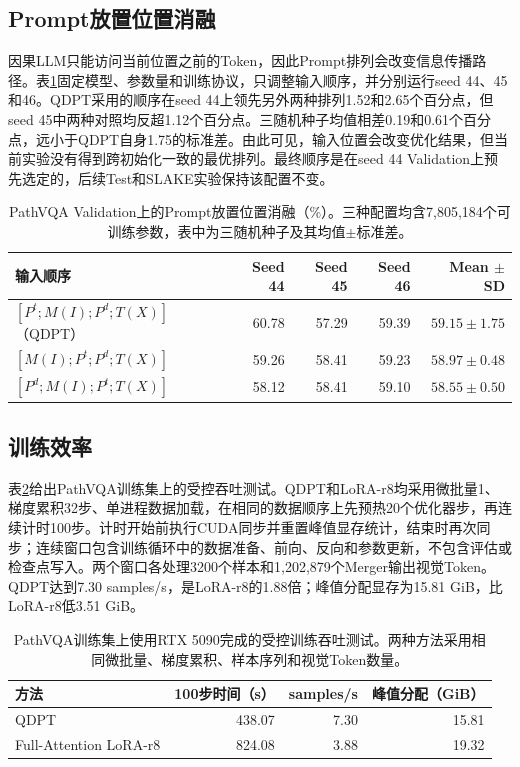 \documentclass[pdflatex,sn-mathphys-num]{sn-jnl}
\begin{document}
\subsection{Prompt放置位置消融}

因果LLM只能访问当前位置之前的Token，因此Prompt排列会改变信息传播路径。表\ref{tab:prompt-placement}固定模型、参数量和训练协议，只调整输入顺序，并分别运行seed 44、45和46。QDPT采用的顺序在seed 44上领先另外两种排列1.52和2.65个百分点，但seed 45中两种对照均反超1.12个百分点。三随机种子均值相差0.19和0.61个百分点，远小于QDPT自身1.75的标准差。由此可见，输入位置会改变优化结果，但当前实验没有得到跨初始化一致的最优排列。最终顺序是在seed 44 Validation上预先选定的，后续Test和SLAKE实验保持该配置不变。

\begin{table}[t]
    \centering
    \caption{PathVQA Validation上的Prompt放置位置消融（\%）。三种配置均含7,805,184个可训练参数，表中为三随机种子及其均值$\pm$标准差。}
    \label{tab:prompt-placement}
    \scriptsize
    \begin{tabular}{@{}lrrrr@{}}
        \toprule
        输入顺序 & Seed 44 & Seed 45 & Seed 46 & Mean $\pm$ SD \\
        \midrule
        $[P^{t};M(I);P^{d};T(X)]$（QDPT） & 60.78 & 57.29 & 59.39 & $59.15\pm1.75$ \\
        $[M(I);P^{t};P^{d};T(X)]$ & 59.26 & 58.41 & 59.23 & $58.97\pm0.48$ \\
        $[P^{d};M(I);P^{t};T(X)]$ & 58.12 & 58.41 & 59.10 & $58.55\pm0.50$ \\
        \bottomrule
    \end{tabular}
\end{table}

\subsection{训练效率}

表\ref{tab:training-efficiency}给出PathVQA训练集上的受控吞吐测试。QDPT和LoRA-r8均采用微批量1、梯度累积32步、单进程数据加载，在相同的数据顺序上先预热20个优化器步，再连续计时100步。计时开始前执行CUDA同步并重置峰值显存统计，结束时再次同步；连续窗口包含训练循环中的数据准备、前向、反向和参数更新，不包含评估或检查点写入。两个窗口各处理3200个样本和1,202,879个Merger输出视觉Token。QDPT达到7.30 samples/s，是LoRA-r8的1.88倍；峰值分配显存为15.81 GiB，比LoRA-r8低3.51 GiB。

\begin{table}[t]
    \centering
    \caption{PathVQA训练集上使用RTX 5090完成的受控训练吞吐测试。两种方法采用相同微批量、梯度累积、样本序列和视觉Token数量。}
    \label{tab:training-efficiency}
    \small
    \begin{tabular}{@{}lrrr@{}}
        \toprule
        方法 & 100步时间（s） & samples/s & 峰值分配（GiB） \\
        \midrule
        QDPT & 438.07 & 7.30 & 15.81 \\
        Full-Attention LoRA-r8 & 824.08 & 3.88 & 19.32 \\
        \bottomrule
    \end{tabular}
\end{table}
\end{document}

